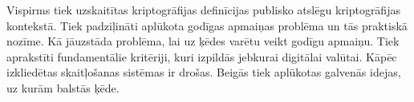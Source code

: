 Vispirms tiek uzskaitītas kriptogrāfijas definīcijas publisko atslēgu kriptogrāfijas kontekstā. 
Tiek padziļināti aplūkota godīgas apmaiņas problēma un tās praktiskā nozīme.
Kā jāuzstāda problēma, lai uz ķēdes varētu veikt godīgu apmaiņu.
Tiek aprakstīti fundamentālie kritēriji, kuri izpildās jebkurai digitālai valūtai.
Kāpēc izkliedētas skaitļošanas sistēmas ir drošas.
Beigās tiek aplūkotas galvenās idejas, uz kurām balstās ķēde.
